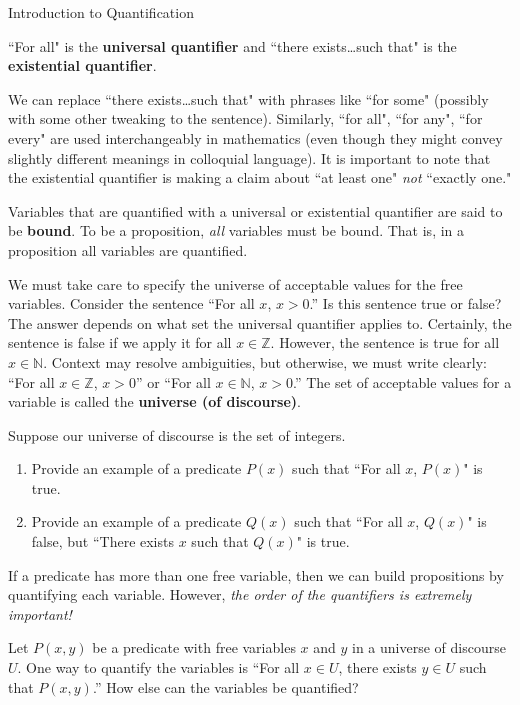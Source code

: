 \begin{section}{Introduction to Quantification}
\begin{definition}
``For all" is the \textbf{universal quantifier} and ``there exists\ldots such that" is the \textbf{existential quantifier}.
\end{definition}

We can replace ``there exists\ldots such that" with phrases  like ``for some" (possibly with some other tweaking to the sentence). Similarly, ``for all", ``for any", ``for every" are used interchangeably in mathematics (even though they might convey slightly different meanings in colloquial language). It is important to note that the existential quantifier is making a claim about ``at least one" \emph{not} ``exactly one." 

Variables that are quantified with a universal or existential quantifier are said to be \textbf{bound}.  To be a proposition, \emph{all} variables must be bound. That is, in a proposition all variables are quantified. 

We must take care to specify the universe of acceptable values for the free variables. Consider the sentence ``For all $x$, $x>0$.'' Is this sentence true or false? The answer depends on what set the universal quantifier applies to. Certainly, the sentence is false if we apply it for all $x\in\mathbb{Z}$. However, the sentence is true for all $x\in\mathbb{N}$. Context may resolve ambiguities, but otherwise, we must write clearly: ``For all $x\in\mathbb{Z}$, $x>0$'' or ``For all $x\in\mathbb{N}$, $x>0$.'' The set of acceptable values for a variable is called the \textbf{universe (of discourse)}.

\begin{problem}
Suppose our universe of discourse is the set of integers.
\begin{enumerate}[label=\textrm{(\alph*)}]
\item Provide an example of a predicate $P(x)$ such that ``For all $x$, $P(x)$" is true.
\item Provide an example of a predicate $Q(x)$ such that ``For all $x$, $Q(x)$" is false, but ``There exists $x$ such that $Q(x)$" is true.
\end{enumerate}
\end{problem}

If a predicate has more than one free variable, then we can build propositions by quantifying each variable.  However, \emph{the order of the quantifiers is extremely important!}

\begin{problem}\label{prob:ways to quantify}
Let $P(x,y)$ be a predicate with free variables $x$ and $y$ in a universe of discourse $U$. One way to quantify the variables is ``For all $x \in U$, there exists $y \in U$ such that $P(x,y)$.'' How else can the variables be quantified?
\end{problem}


\end{section}
